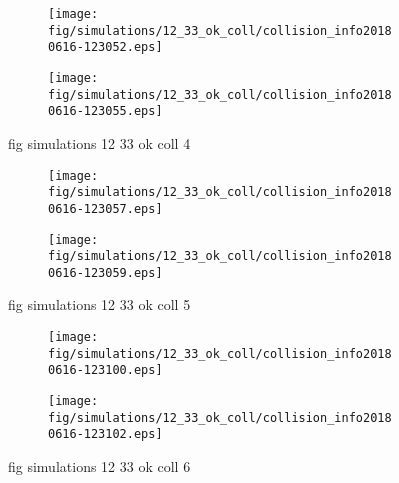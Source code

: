\begin{figure}[H]
	\centering
	\begin{subfigure}[b]{0.8\textwidth}
		\texttt{[image: fig/simulations/12\_33\_ok\_coll/collision\_info20180616-123052.eps]}
		\caption{}
		\label{fig:simulations:12_33_ok_coll:collision_info20180616-123052}
	\end{subfigure}

	\begin{subfigure}[b]{0.8\textwidth}
		\texttt{[image: fig/simulations/12\_33\_ok\_coll/collision\_info20180616-123055.eps]}
		\caption{}
		\label{fig:simulations:12_33_ok_coll:collision_info20180616-123055}
	\end{subfigure}
	\caption{fig simulations 12 33 ok coll 4}
	\label{fig:simulations:12_33_ok_coll:4}
\end{figure}

\begin{figure}[H]
	\centering
	\begin{subfigure}[b]{0.8\textwidth}
		\texttt{[image: fig/simulations/12\_33\_ok\_coll/collision\_info20180616-123057.eps]}
		\caption{}
		\label{fig:simulations:12_33_ok_coll:collision_info20180616-123057}
	\end{subfigure}

	\begin{subfigure}[b]{0.8\textwidth}
		\texttt{[image: fig/simulations/12\_33\_ok\_coll/collision\_info20180616-123059.eps]}
		\caption{}
		\label{fig:simulations:12_33_ok_coll:collision_info20180616-123059}
	\end{subfigure}
	\caption{fig simulations 12 33 ok coll 5}
	\label{fig:simulations:12_33_ok_coll:5}
\end{figure}

\begin{figure}[H]
	\centering
	\begin{subfigure}[b]{0.8\textwidth}
		\texttt{[image: fig/simulations/12\_33\_ok\_coll/collision\_info20180616-123100.eps]}
		\caption{}
		\label{fig:simulations:12_33_ok_coll:collision_info20180616-123100}
	\end{subfigure}

	\begin{subfigure}[b]{0.8\textwidth}
		\texttt{[image: fig/simulations/12\_33\_ok\_coll/collision\_info20180616-123102.eps]}
		\caption{}
		\label{fig:simulations:12_33_ok_coll:collision_info20180616-123102}
	\end{subfigure}
	\caption{fig simulations 12 33 ok coll 6}
	\label{fig:simulations:12_33_ok_coll:6}
\end{figure}

